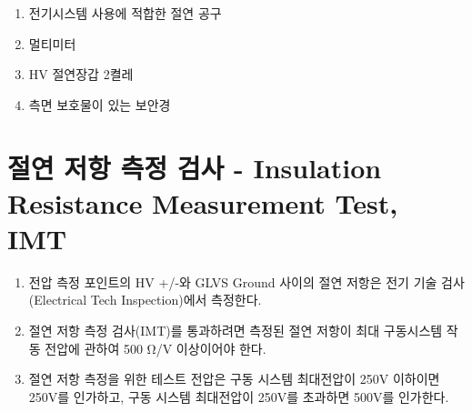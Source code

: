 \documentclass[final,a4paper,10pt]{report}
\begin{document}
\begin{enumerate}
\begin{enumerate}
      \item\label{rule:formula-technical.electrical-system-inspection.required-equipment.insulated-tools} 전기시스템 사용에 적합한 절연 공구
      \item\label{rule:formula-technical.electrical-system-inspection.required-equipment.multimeter} 멀티미터
      \item\label{rule:formula-technical.electrical-system-inspection.required-equipment.hv-insulating-gloves} HV 절연장갑 2켤레
      \item\label{rule:formula-technical.electrical-system-inspection.required-equipment.side-shield-safety-glasses} 측면 보호물이 있는 보안경
    \end{enumerate}
\end{enumerate}

\section{절연 저항 측정 검사 - Insulation Resistance Measurement Test, IMT}\label{rule:formula-technical.insulation-resistance-test} \label{section:절연 저항 측정 검사}
\begin{enumerate}
  \item\label{rule:formula-technical.insulation-resistance-test.measured-during-tech-inspection} 전압 측정 포인트의 HV +/-와 GLVS Ground 사이의 절연 저항은 전기 기술 검사(Electrical Tech Inspection)에서 측정한다.
  \item\label{rule:formula-technical.insulation-resistance-test.min-resistance-500ohmv} 절연 저항 측정 검사(IMT)를 통과하려면 측정된 절연 저항이 최대 구동시스템 작동 전압에 관하여 500 Ω/V 이상이어야 한다.
  \item\label{rule:formula-technical.insulation-resistance-test.test-voltage-selection} 절연 저항 측정을 위한 테스트 전압은 구동 시스템 최대전압이 250V 이하이면 250V를 인가하고, 구동 시스템 최대전압이 250V를 초과하면 500V를 인가한다.
\end{enumerate}
\end{document}
